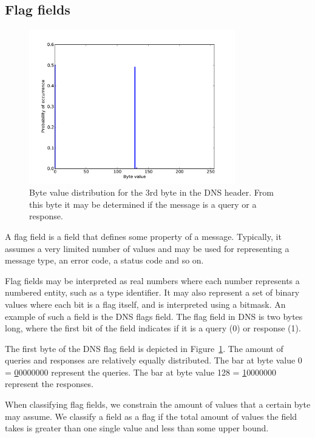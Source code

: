 \documentclass[a4paper]{report}
\begin{document}
\newpage

\subsection{Flag fields}
\begin{figure}[h]
    \centering
    \includegraphics[width=0.8\textwidth]{img/flag}
    \captionsetup{width=0.8\textwidth}
    \caption{Byte value distribution for the 3rd byte in the DNS header.
    From this byte it may be determined if the message is a query or a
    response.}
    \label{fig:flag}
\end{figure}

A flag field is a field that defines some property of a message. Typically,
it assumes a very limited number of values and may be used for representing
a message type, an error code, a status code and so on.

Flag fields may be interpreted as real numbers where each number represents a numbered entity, such as a
type identifier. It may also represent a set of binary values where each bit
is a flag itself, and is interpreted using a bitmask. An example of such a
field is the DNS flags field. The flag field in DNS is two bytes long, where
the first bit of the field indicates if it is a query (0) or response (1).

The first byte of the DNS flag field is depicted in Figure~\ref{fig:flag}.
The amount of queries and responses are relatively equally distributed. The
bar at byte value 0 = \underline{0}0000000 represent the queries. The bar at
byte value 128 = \underline{1}0000000 represent the responses.

When classifying flag fields, we constrain the amount of values that a
certain byte may assume. We classify a field as a flag if the total amount
of values the field takes is greater than one single value and less than
some upper bound.
\end{document}
